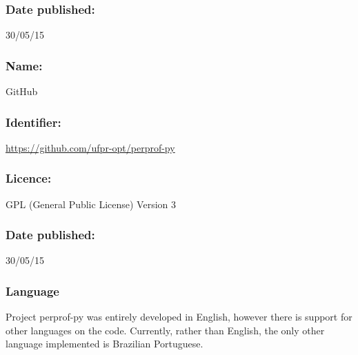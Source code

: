     \subsubsection*{Date published:} 30/05/15

\CodeRepository

    \subsubsection*{Name:} GitHub

    \subsubsection*{Identifier:} \url{https://github.com/ufpr-opt/perprof-py}

    \subsubsection*{Licence:} GPL (General Public License) Version 3

    \subsubsection*{Date published:} 30/05/15

\subsubsection*{Language}

    Project perprof-py was entirely developed in English, however there is support for
    other languages on the code. Currently,  rather than English, the only other language implemented is Brazilian Portuguese.

